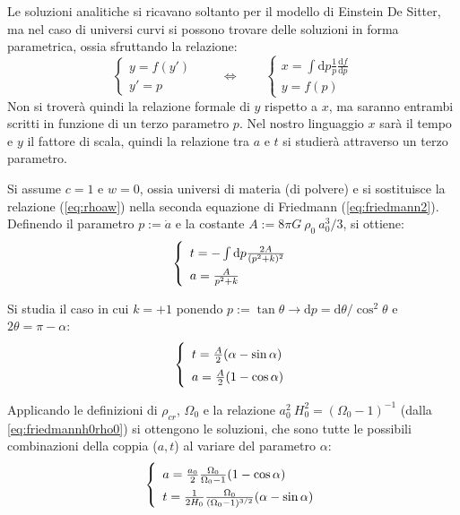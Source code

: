 Le soluzioni analitiche  si ricavano soltanto per il modello di Einstein De Sitter, ma nel caso di universi curvi si possono trovare delle soluzioni in forma parametrica, ossia sfruttando la relazione: 
$$
\left\{\begin{matrix}
y= f(y')\\ 
y'=p
\end{matrix}\right. \qquad \Leftrightarrow \qquad 
\left\{\begin{matrix}
x= \int \mathrm{d}p \frac{1}{p}\frac{\mathrm{d} f}{\mathrm{d} p}\\ 
y=f(p)
\end{matrix}\right.
$$
Non si troverà quindi la relazione formale di $y$ rispetto a $x$, ma saranno entrambi scritti in funzione di un terzo parametro $p$. Nel nostro linguaggio $x$ sarà il tempo e $y$ il fattore di scala, quindi la relazione tra $a$ e $t$ si studierà attraverso un terzo parametro.

Si assume $c=1$ e $w=0$, ossia universi di materia (di polvere) e si sostituisce la relazione (\ref{eq:rhoaw}) nella seconda equazione di Friedmann (\ref{eq:friedmann2}). Definendo il parametro $p:=\dot{a}$ e la costante $A:= 8\pi G ~\rho_0 ~ a_0^3 /3$, si ottiene:
\begin{equation*}\left\{
\def\arraystretch{1.5}
    \begin{array}{ll}
    t=-\int \mathrm{d}p \frac{2A}{(p^2+k)^2} \\
    a=\frac{A}{p^2+k}
\end{array}\right.
\end{equation*}

Si studia il caso in cui $k=+1$ ponendo $p:= \tan \theta \rightarrow \mathrm{d}p=\mathrm{d}\theta / \cos^2 \theta$ e $2\theta = \pi-\alpha$:
\begin{equation*}\left\{
\def\arraystretch{1.5}
    \begin{array}{ll}
    t=\frac{A}{2}(\alpha - \sin \alpha) \\
    a=\frac{A}{2}(1 - \cos \alpha)
\end{array}\right.
\end{equation*}

Applicando le definizioni di $\rho_{cr}$, $\Omega_0$ e la relazione $a_0^2 ~H_0^2 = (\Omega_0 -1)^{-1}$ (dalla \ref{eq:friedmannh0rho0}) si ottengono le soluzioni, che sono tutte le possibili combinazioni della coppia ($a,t$) al variare del parametro $\alpha$:
\begin{equation}\left\{
\def\arraystretch{1.5}
    \begin{array}{ll}
    a=\frac{a_0}{2} \frac{\Omega_0}{\Omega_0 -1}    (1 - \cos \alpha) \\
    t=\frac{1}{2H_0} \frac{\Omega_0}{(\Omega_0 -1)^{3/2}}  (\alpha - \sin \alpha)
\end{array}\right.
\end{equation}

